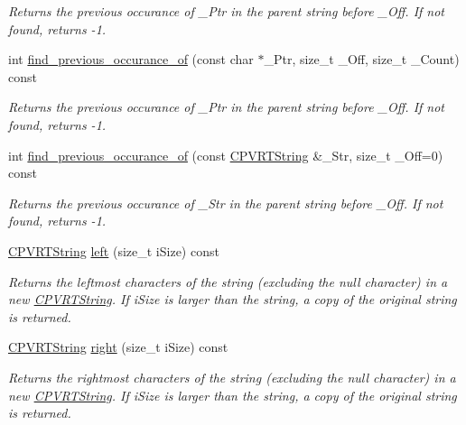 \begin{DoxyCompactItemize}
\begin{DoxyCompactList}\small\item\em Returns the previous occurance of \+\_\+\+Ptr in the parent string before \+\_\+\+Off. If not found, returns -\/1. \end{DoxyCompactList}\item 
int \hyperlink{class_c_p_v_r_t_string_a19d8c94396debffd4b1b6b714556faa2}{find\+\_\+previous\+\_\+occurance\+\_\+of} (const char $\ast$\+\_\+\+Ptr, size\+\_\+t \+\_\+\+Off, size\+\_\+t \+\_\+\+Count) const 
\begin{DoxyCompactList}\small\item\em Returns the previous occurance of \+\_\+\+Ptr in the parent string before \+\_\+\+Off. If not found, returns -\/1. \end{DoxyCompactList}\item 
int \hyperlink{class_c_p_v_r_t_string_a52b726a7249e0cc0da883dc9bcab246c}{find\+\_\+previous\+\_\+occurance\+\_\+of} (const \hyperlink{class_c_p_v_r_t_string}{C\+P\+V\+R\+T\+String} \&\+\_\+\+Str, size\+\_\+t \+\_\+\+Off=0) const 
\begin{DoxyCompactList}\small\item\em Returns the previous occurance of \+\_\+\+Str in the parent string before \+\_\+\+Off. If not found, returns -\/1. \end{DoxyCompactList}\item 
\hyperlink{class_c_p_v_r_t_string}{C\+P\+V\+R\+T\+String} \hyperlink{class_c_p_v_r_t_string_ab5dde5b0bedbbe83788fda762ba940cc}{left} (size\+\_\+t i\+Size) const 
\begin{DoxyCompactList}\small\item\em Returns the leftmost characters of the string (excluding the null character) in a new \hyperlink{class_c_p_v_r_t_string}{C\+P\+V\+R\+T\+String}. If i\+Size is larger than the string, a copy of the original string is returned. \end{DoxyCompactList}\item 
\hyperlink{class_c_p_v_r_t_string}{C\+P\+V\+R\+T\+String} \hyperlink{class_c_p_v_r_t_string_a2dd6f07102e510a9746fc36c4089a94a}{right} (size\+\_\+t i\+Size) const 
\begin{DoxyCompactList}\small\item\em Returns the rightmost characters of the string (excluding the null character) in a new \hyperlink{class_c_p_v_r_t_string}{C\+P\+V\+R\+T\+String}. If i\+Size is larger than the string, a copy of the original string is returned. \end{DoxyCompactList}\item 

\end{DoxyCompactItemize}
